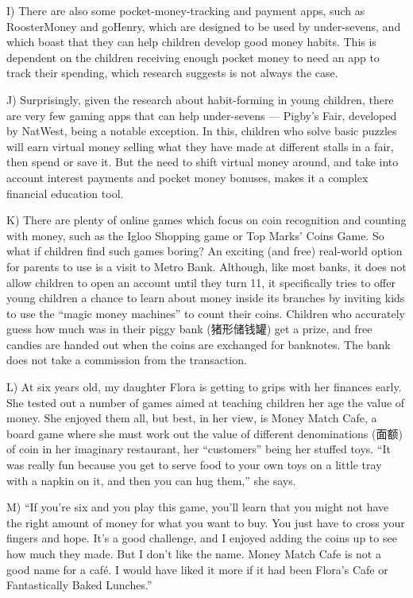 \documentclass[UTF8,11pt]{ctexart}
\begin{document}
I) There are also some pocket-money-tracking and payment apps, such as RoosterMoney and goHenry, which are designed to be used by under-sevens, and which boast that they can help children develop good money habits. This is dependent on the children receiving enough pocket money to need an app to track their spending, which research suggests is not always the case.


J) Surprisingly, given the research about habit-forming in young children, there are very few gaming apps that can help under-sevens — Pigby’s Fair, developed by NatWest, being a notable exception. In this, children who solve basic puzzles will earn virtual money selling what they have made at different stalls in a fair, then spend or save it. But the need to shift virtual money around, and take into account interest payments and pocket money bonuses, makes it a complex financial education tool.


K) There are plenty of online games which focus on coin recognition and counting with money, such as the Igloo Shopping game or Top Marks’ Coins Game. So what if children find such games boring? An exciting (and free) real-world option for parents to use is a visit to Metro Bank. Although, like most banks, it does not allow children to open an account until they turn 11, it specifically tries to offer young children a chance to learn about money inside its branches by inviting kids to use the “magic money machines” to count their coins. Children who accurately guess how much was in their piggy bank (猪形储钱罐) get a prize, and free candies are handed out when the coins are exchanged for banknotes. The bank does not take a commission from the transaction.


L) At six years old, my daughter Flora is getting to grips with her finances early. She tested out a number of games aimed at teaching children her age the value of money. She enjoyed them all, but best, in her view, is Money Match Cafe, a board game where she must work out the value of different denominations (面额) of coin in her imaginary restaurant, her “customers” being her stuffed toys. “It was really fun because you get to serve food to your own toys on a little tray with a napkin on it, and then you can hug them,” she says.


M) “If you’re six and you play this game, you’ll learn that you might not have the right amount of money for what you want to buy. You just have to cross your fingers and hope. It’s a good challenge, and I enjoyed adding the coins up to see how much they made. But I don’t like the name. Money Match Cafe is not a good name for a café. I would have liked it more if it had been Flora’s Cafe or Fantastically Baked Lunches.”
\end{document}
